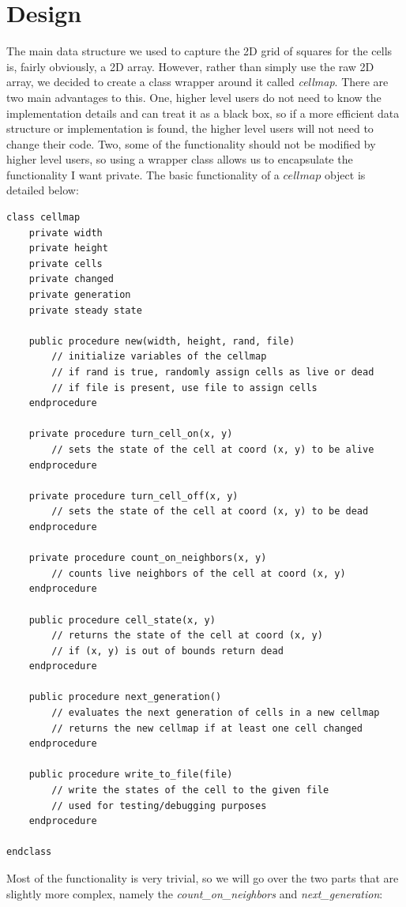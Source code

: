 \documentclass[12pt]{report}
\begin{document}
\chapter{Design}
The main data structure we used to capture the 2D grid of squares for the cells is, fairly obviously, a 2D array.
However, rather than simply use the raw 2D array, we decided to create a class wrapper around it called \emph{cellmap}.
There are two main advantages to this. One, higher level users do not need to know the implementation details and can treat
it as a black box, so if a more efficient data structure or implementation is found, 
the higher level users will not need to change their code.
Two, some of the functionality should not be modified by higher level users, so using a wrapper class allows us to encapsulate the functionality I want private.
The basic functionality of a $cellmap$ object is detailed below:
\begin{verbatim}
class cellmap
    private width
    private height
    private cells
    private changed
    private generation
    private steady state

    public procedure new(width, height, rand, file)
        // initialize variables of the cellmap 
        // if rand is true, randomly assign cells as live or dead
        // if file is present, use file to assign cells
    endprocedure

    private procedure turn_cell_on(x, y)
        // sets the state of the cell at coord (x, y) to be alive
    endprocedure

    private procedure turn_cell_off(x, y)
        // sets the state of the cell at coord (x, y) to be dead
    endprocedure

    private procedure count_on_neighbors(x, y)
        // counts live neighbors of the cell at coord (x, y)
    endprocedure

    public procedure cell_state(x, y)
        // returns the state of the cell at coord (x, y)
        // if (x, y) is out of bounds return dead
    endprocedure

    public procedure next_generation()
        // evaluates the next generation of cells in a new cellmap
        // returns the new cellmap if at least one cell changed
    endprocedure

    public procedure write_to_file(file)
        // write the states of the cell to the given file
        // used for testing/debugging purposes
    endprocedure

endclass
\end{verbatim}
Most of the functionality is very trivial, so we will go over the two parts that are slightly more complex,
namely the \emph{count\_on\_neighbors} and \emph{next\_generation}:\\
\end{document}
